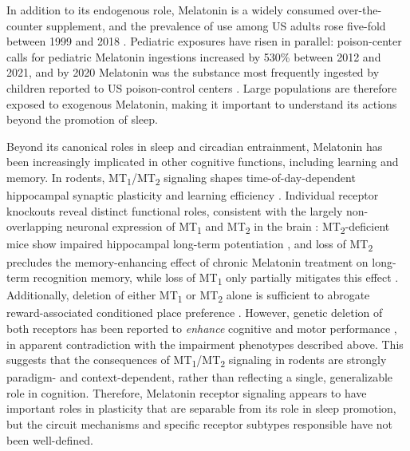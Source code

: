 \documentclass[9.5pt]{RandlettLab_elife}            %
\begin{document}
In addition to its endogenous role, Melatonin is a widely consumed over-the-counter supplement, and the prevalence of use among US adults rose five-fold between 1999 and 2018 \citep{Li2022}.
Pediatric exposures have risen in parallel: poison-center calls for pediatric Melatonin ingestions increased by 530\% between 2012 and 2021, and by 2020 Melatonin was the substance most frequently ingested by children reported to US poison-control centers \citep{Gummin2021,Lelak2022}.
Large populations are therefore exposed to exogenous Melatonin, making it important to understand its actions beyond the promotion of sleep.

Beyond its canonical roles in sleep and circadian entrainment, Melatonin has been increasingly implicated in other cognitive functions, including learning and memory.
In rodents, MT\textsubscript{1}/MT\textsubscript{2} signaling shapes time-of-day-dependent hippocampal synaptic plasticity and learning efficiency \citep{Jilg2019-oy}.
Individual receptor knockouts reveal distinct functional roles, consistent with the largely non-overlapping neuronal expression of MT\textsubscript{1} and MT\textsubscript{2} in the brain \citep{Klosen2019}: MT\textsubscript{2}-deficient mice show impaired hippocampal long-term potentiation \citep{Larson2006}, and loss of MT\textsubscript{2} precludes the memory-enhancing effect of chronic Melatonin treatment on long-term recognition memory, while loss of MT\textsubscript{1} only partially mitigates this effect \citep{Pistono2021}. 
Additionally, deletion of either MT\textsubscript{1} or MT\textsubscript{2} alone is sufficient to abrogate reward-associated conditioned place preference \citep{Clough2014}.
However, genetic deletion of both receptors has been reported to \emph{enhance} cognitive and motor performance \citep{ONealMoffitt2014}, in apparent contradiction with the impairment phenotypes described above.
This suggests that the consequences of MT\textsubscript{1}/MT\textsubscript{2} signaling in rodents are strongly paradigm- and context-dependent, rather than reflecting a single, generalizable role in cognition.
Therefore, Melatonin receptor signaling appears to have important roles in plasticity that are separable from its role in sleep promotion, but the circuit mechanisms and specific receptor subtypes responsible have not been well-defined.
\end{document}
